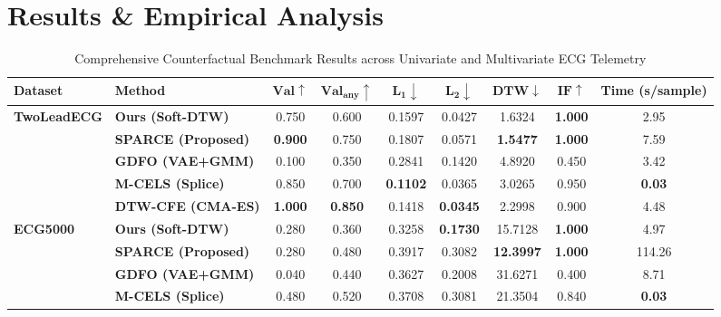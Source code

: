 \documentclass[conference]{IEEEtran}
\begin{document}
\section{Results \& Empirical Analysis}

\begin{table}[!t]
\caption{Comprehensive Counterfactual Benchmark Results across Univariate and Multivariate ECG Telemetry}
\label{tab:ecg_results}
\centering
\footnotesize
\setlength{\tabcolsep}{4.5pt}
\renewcommand{\arraystretch}{0.95}
\begin{tabular}{llccccccc}
\toprule
\textbf{Dataset} & \textbf{Method} & $\mathbf{Val} \uparrow$ & $\mathbf{Val_{\text{any}}} \uparrow$ & $\mathbf{L_1} \downarrow$ & $\mathbf{L_2} \downarrow$ & $\mathbf{DTW} \downarrow$ & $\mathbf{IF} \uparrow$ & \textbf{Time (s/sample)} \\
\midrule
\multirow{5}{*}{\textbf{TwoLeadECG}} 
& \textbf{Ours (Soft-DTW)} & 0.750 & 0.600 & 0.1597 & 0.0427 & 1.6324 & \textbf{1.000} & 2.95 \\
& \textbf{SPARCE (Proposed)} & \textbf{0.900} & 0.750 & 0.1807 & 0.0571 & \textbf{1.5477} & \textbf{1.000} & 7.59 \\
& \textbf{GDFO (VAE+GMM)} & 0.100 & 0.350 & 0.2841 & 0.1420 & 4.8920 & 0.450 & 3.42 \\
& \textbf{M-CELS (Splice)} & 0.850 & 0.700 & \textbf{0.1102} & 0.0365 & 3.0265 & 0.950 & \textbf{0.03} \\
& \textbf{DTW-CFE (CMA-ES)} & \textbf{1.000} & \textbf{0.850} & 0.1418 & \textbf{0.0345} & 2.2998 & 0.900 & 4.48 \\
\midrule
\multirow{5}{*}{\textbf{ECG5000}} 
& \textbf{Ours (Soft-DTW)} & 0.280 & 0.360 & 0.3258 & \textbf{0.1730} & 15.7128 & \textbf{1.000} & 4.97 \\
& \textbf{SPARCE (Proposed)} & 0.280 & 0.480 & 0.3917 & 0.3082 & \textbf{12.3997} & \textbf{1.000} & 114.26 \\
& \textbf{GDFO (VAE+GMM)} & 0.040 & 0.440 & 0.3627 & 0.2008 & 31.6271 & 0.400 & 8.71 \\
& \textbf{M-CELS (Splice)} & 0.480 & 0.520 & 0.3708 & 0.3081 & 21.3504 & 0.840 & \textbf{0.03} \\

\end{tabular}
\end{table}
\end{document}
